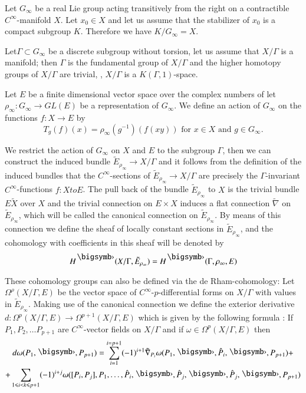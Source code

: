 Let $G_\infty$ be a real Lie group acting transitively from the right on a contractible $C^\infty$-manifold $X$. Let $x_0 \in X$ and let us assume that the stabilizer of $x_0$ is a compact subgroup $K$. Therefore we have $K / G_\infty = X$. 

Let\pageoriginale $\Gamma \subset G_\infty$ be a discrete subgroup without torsion, let us assume that $X/\Gamma$ is a manifold; then $\Gamma$ is the fundamental group of $X/ \Gamma$ and the higher homotopy groups of $X / \Gamma$ are trivial, \ie, $X/ \Gamma$ is a $K (\Gamma , 1)$-space.

Let $E$ be a finite dimensional vector space over the complex numbers of let $\rho_\infty: G_\infty \to G L (E)$ be a representation of $G_\infty$. We define an action of $G_\infty$ on the functions $f : X \to E$ by
$$
T_g (f) (x) = \rho_\infty (g^{-1}) (f (xy)) \text{ for } x \in X \text{ and } g \in G_\infty.
$$

We restrict the action of $G_\infty$ on $X$ and $E$ to the subgroup $\Gamma$, then we can construct the induced bundle $\tilde{E}_{\rho_\infty} \to X / \Gamma$ and it follows from the definition of the induced bundles that the $C^\infty$-sections of $\tilde{E}_{\rho_\infty} \to X / \Gamma$ are precisely the $\Gamma$-invariant $C^\infty$-functions $f: X to E$. The pull back of the bundle $\tilde{E}_{\rho_\infty}$ to $X$ is the trivial bundle $E \tilde X$ over $X$ and the trivial connection on $E \times X$ induces a flat connection $\tilde{\nabla}$ on $\tilde{E}_{\rho_\infty}$, which will be called the canonical connection on $\tilde{E}_{\rho_\infty}$. By means of this connection we define the sheaf of locally constant sections in $\tilde{E}_{\rho_\infty}$, and the cohomology with coefficients in this sheaf will be denoted by
$$
H^\bigdot (X/ \Gamma, \tilde{E}_{\rho_\infty}) = H^\bigdot (\Gamma, \rho_\infty, E)
$$

These cohomology groups can also be defined via the de Rham-cohomology: Let $\Omega^\rho (X/ \Gamma , E)$ be the vector space of $C^\infty$-$p$-differential forms on $X/\Gamma$ with values in $\tilde{E}_{\rho_\infty}$. Making use of the canonical connection we define the exterior derivative $d: \Omega^p (X/ \Gamma, E) \to \Omega^{p+1} (X/ \Gamma, E)$ which is given by the following formula : If $P_1, P_2,\ldots P_{p+1}$ are $C^\infty$-vector fields on $X/ \Gamma$ and if $\omega \in \Omega^p (X / \Gamma, E)$ then 
\begin{multline}
d\omega (P_1 ,\bigdot, P_{p+1}) = \sum\limits^{i = p+1}_{i=1} (-1)^{i+1} \tilde{\nabla}_{P_i} \omega (P_1, \bigdot, \hat{P}_i, \bigdot, P_{p+1}) + \\
+ \sum\limits_{1 \leqslant i < k \leqslant p+1} (-1)^{i+j} \omega ([P_i, P_j], P_1, \ldots, \hat{P}_i, \bigdot, \hat{P}_j, \bigdot, \hat{P}_j, \bigdot, P_{p+1}) \label{art5-eq1.1}
\end{multline}


